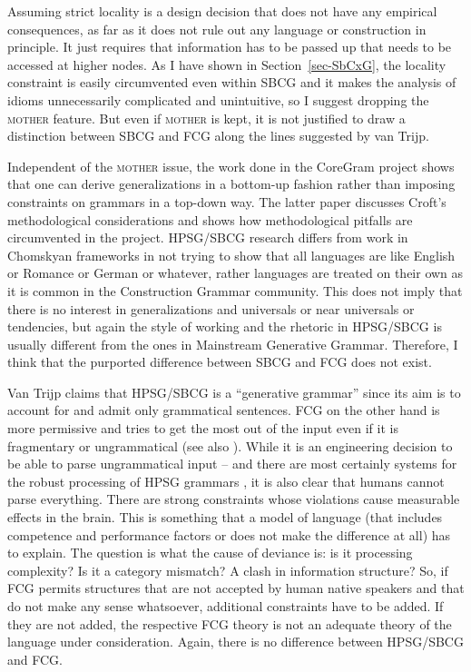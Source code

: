 Assuming strict locality is a design decision that does not have any empirical consequences, as far
as it does not rule out any language or construction in principle. It just requires that information
has to be passed up that needs to be accessed at higher nodes. As I have shown in Section~\ref{sec-SbCxG},
the locality constraint is easily circumvented even within SBCG and it makes the analysis of idioms
unnecessarily complicated and unintuitive, so I suggest dropping the \textsc{mother} feature. But even if \textsc{mother} is kept, it is not justified to draw a
distinction between SBCG and FCG along the lines suggested by van Trijp. 

Independent of the \textsc{mother} issue, the work done in the CoreGram project
\citep{MuellerCoreGramBrief,MuellerCoreGram} shows that one can derive generalizations in a
bottom-up fashion rather than imposing constraints on grammars in a top-down way. The latter paper
discusses Croft's methodological considerations and shows how methodological pitfalls are
circumvented in the project. HPSG/SBCG research differs from work in Chomskyan frameworks in not
trying to show that all languages are like English or Romance or German or whatever, rather
languages are treated on their own as it is common in the Construction Grammar community. This does
not imply that there is no interest in generalizations and universals or near universals or tendencies, but again
the style of working and the rhetoric in HPSG/SBCG is usually different from the ones in Mainstream
Generative Grammar. Therefore, I think that the purported difference
between SBCG and FCG does not exist.


\largerpage[2]
Van Trijp claims that HPSG/SBCG is a ``generative grammar'' since its aim is to account for and admit only
grammatical sentences. FCG on the other hand is more permissive and tries to get the most out of the
input even if it is fragmentary or ungrammatical (see also \citealp[]{Steels2013a}). While it is an engineering decision to be able to parse ungrammatical input --  and 
 there are most certainly systems for the robust processing of HPSG grammars \citep*{KKN2000a-u,Copestake2007a-u}, it is also
clear that humans cannot parse everything. There are strong constraints whose violations cause measurable
effects in the brain. This is something that a model of language (that includes competence and
performance factors or does not make the difference at all) has to explain. The question is
what the cause of deviance is: is it processing complexity? Is it a category mismatch? A clash in
information structure? So, if FCG
permits structures that are not accepted by human native speakers and that do not make any sense
whatsoever, additional constraints have to be added. If they are not added, the respective FCG
theory is not an adequate theory of the language under consideration. Again, there is no difference
between HPSG/SBCG and FCG.  

